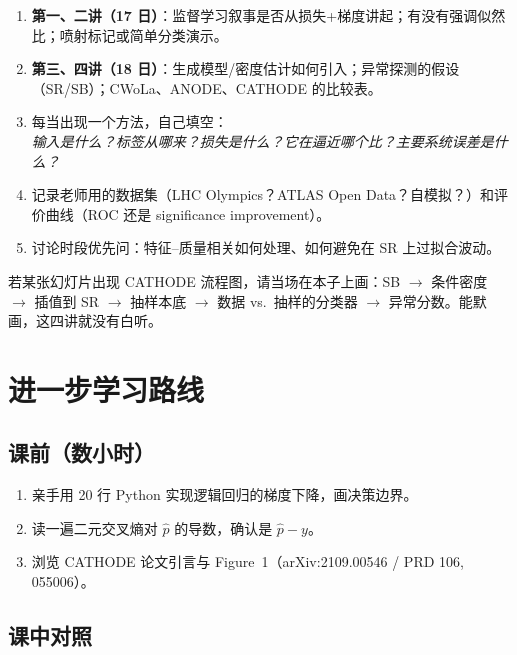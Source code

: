 \documentclass[11pt,a4paper]{article}
\theoremstyle{definition}
\theoremstyle{plain}
\theoremstyle{remark}
\begin{document}
\begin{enumerate}[leftmargin=1.8em]
  \item \textbf{第一、二讲（17 日）}：监督学习叙事是否从损失+梯度讲起；有没有强调似然比；喷射标记或简单分类演示。
  \item \textbf{第三、四讲（18 日）}：生成模型/密度估计如何引入；异常探测的假设（SR/SB）；CWoLa、ANODE、CATHODE 的比较表。
  \item 每当出现一个方法，自己填空：\\
  \emph{输入是什么？标签从哪来？损失是什么？它在逼近哪个比？主要系统误差是什么？}
  \item 记录老师用的数据集（LHC Olympics？ATLAS Open Data？自模拟？）和评价曲线（ROC 还是 significance improvement）。
  \item 讨论时段优先问：特征--质量相关如何处理、如何避免在 SR 上过拟合波动。
\end{enumerate}

\begin{hearbox}
若某张幻灯片出现 CATHODE 流程图，请当场在本子上画：SB $\to$ 条件密度 $\to$ 插值到 SR $\to$ 抽样本底 $\to$ 数据 vs.\ 抽样的分类器 $\to$ 异常分数。能默画，这四讲就没有白听。
\end{hearbox}

\section{进一步学习路线}
\label{sec:next}

\subsection{课前（数小时）}

\begin{enumerate}[leftmargin=1.6em]
  \item 亲手用 20 行 Python 实现逻辑回归的梯度下降，画决策边界。
  \item 读一遍二元交叉熵对 $\hat p$ 的导数，确认是 $\hat p-y$。
  \item 浏览 CATHODE 论文引言与 Figure~1（arXiv:2109.00546 / PRD 106, 055006）。
\end{enumerate}

\subsection{课中对照}
\end{document}
